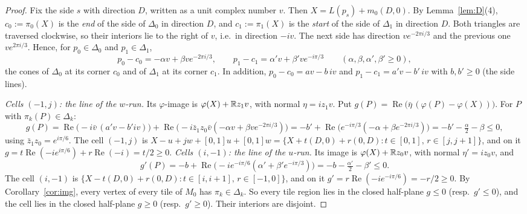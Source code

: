 \documentclass[11pt]{article}
\theoremstyle{definition}\newtheorem{definition}[theorem]{Definition}\newtheorem{remark}[theorem]{Remark}
\begin{document}
\begin{proof}
Fix the side $s$ with direction $D$, written as a unit complex number $v$. Then $X=L(p_s)+m_0(D,0)$. By Lemma~\ref{lem:D}(4), $c_0:=\pi_0(X)$ is the \emph{end} of the side of $\Delta_0$ in direction $D$, and $c_1:=\pi_1(X)$ is the \emph{start} of the side of $\Delta_1$ in direction $D$. Both triangles are traversed clockwise, so their interiors lie to the right of $v$, i.e.\ in direction $-iv$. The next side has direction $ve^{-2\pi i/3}$ and the previous one $ve^{2\pi i/3}$. Hence, for $p_0\in\Delta_0$ and $p_1\in\Delta_1$,
\[p_0-c_0=-\alpha v+\beta ve^{-2\pi i/3},\qquad p_1-c_1=\alpha'v+\beta've^{-i\pi/3}\qquad(\alpha,\beta,\alpha',\beta'\ge0),\]
the cones of $\Delta_0$ at its corner $c_0$ and of $\Delta_1$ at its corner $c_1$. In addition, $p_0-c_0=av-b\,iv$ and $p_1-c_1=a'v-b'\,iv$ with $b,b'\ge0$ (the side lines).

\emph{Cells $(-1,j)$: the line of the $w$-run.} Its $\varphi$-image is $\varphi(X)+\mathbb R z_1v$, with normal $\eta=iz_1v$. Put $g(P)=\operatorname{Re}\big(\bar\eta\,(\varphi(P)-\varphi(X))\big)$. For $P$ with $\pi_k(P)\in\Delta_k$:
\[g(P)=\operatorname{Re}\big(-i\bar v\,(a'v-b'iv)\big)+\operatorname{Re}\big(-i\bar z_1z_0\bar v(-\alpha v+\beta ve^{-2\pi i/3})\big)=-b'+\operatorname{Re}\big(e^{-i\pi/3}(-\alpha+\beta e^{-2\pi i/3})\big)=-b'-\tfrac{\alpha}{2}-\beta\le0,\]
using $\bar z_1z_0=e^{i\pi/6}$. The cell $(-1,j)$ is $X-u+jw+[0,1]u+[0,1]w=\{X+t(D,0)+r(0,D):t\in[0,1],\,r\in[j,j+1]\}$, and on it $g=t\operatorname{Re}(-i e^{i\pi/6})+r\operatorname{Re}(-i)=t/2\ge0$.
\emph{Cells $(i,-1)$: the line of the $u$-run.} Its image is $\varphi(X)+\mathbb R z_0v$, with normal $\eta'=iz_0v$, and
\[g'(P)=-b+\operatorname{Re}\big(-ie^{-i\pi/6}(\alpha'+\beta'e^{-i\pi/3})\big)=-b-\tfrac{\alpha'}{2}-\beta'\le0.\]
The cell $(i,-1)$ is $\{X-t(D,0)+r(0,D):t\in[i,i+1],\,r\in[-1,0]\}$, and on it $g'=r\operatorname{Re}(-ie^{-i\pi/6})=-r/2\ge0$.
By Corollary~\ref{cor:img}, every vertex of every tile of $M_0$ has $\pi_k\in\Delta_k$. So every tile region lies in the closed half-plane $g\le0$ (resp.\ $g'\le0$), and the cell lies in the closed half-plane $g\ge0$ (resp.\ $g'\ge0$). Their interiors are disjoint.
\end{proof}
\end{document}
